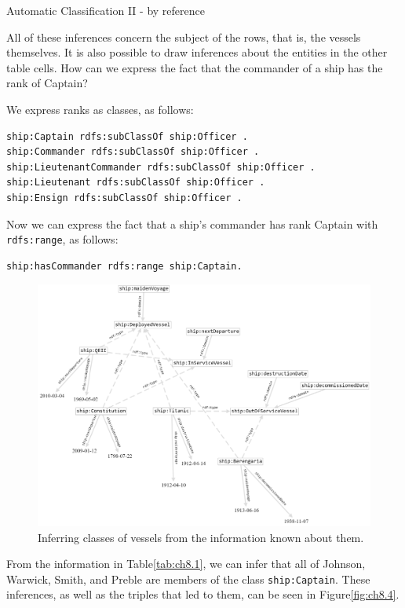 \begin{challenge}{Automatic Classification II - by reference }

All of these inferences concern the subject of the rows, that is, the
vessels themselves. It is also possible to draw inferences about the
entities in the other table cells.
How can we express the fact that the commander of a ship has the rank of
Captain?

\solution

We express ranks as classes, as follows:

\begin{lstlisting}
ship:Captain rdfs:subClassOf ship:Officer .
ship:Commander rdfs:subClassOf ship:Officer .
ship:LieutenantCommander rdfs:subClassOf ship:Officer .
ship:Lieutenant rdfs:subClassOf ship:Officer .
ship:Ensign rdfs:subClassOf ship:Officer .
\end{lstlisting}

Now we can express the fact that a ship's commander has rank Captain
with \texttt{rdfs:range}, as follows:

\begin{lstlisting}
ship:hasCommander rdfs:range ship:Captain.
\end{lstlisting}

\begin{figure}
\centering
\includegraphics[width=5in]{SWWOv3/media/ch8/figure8-3.png}
\caption{Inferring classes of vessels from the information known about them.}
\label{fig:ch8.3}
\end{figure}


From the information in Table\ref{tab:ch8.1}, we can infer that all of Johnson,
Warwick, Smith, and Preble are members of the class \texttt{ship:Captain}. These
inferences, as well as the triples that led to them, can be seen in
Figure\ref{fig:ch8.4}.


\end{challenge}
